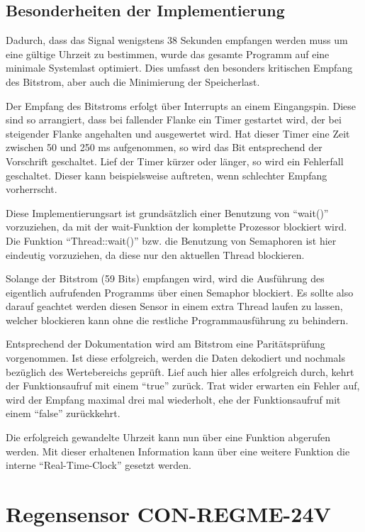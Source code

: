 			\cite{DCF77Wiki}
		\subsection{Besonderheiten der Implementierung}
			Dadurch, dass das Signal wenigstens 38 Sekunden empfangen werden muss um eine gültige Uhrzeit zu bestimmen, wurde das gesamte Programm auf eine minimale Systemlast optimiert. Dies umfasst den besonders kritischen Empfang des Bitstrom, aber auch die Minimierung der Speicherlast.
			
			Der Empfang des Bitstroms erfolgt über Interrupts an einem Eingangspin. Diese sind so arrangiert, dass bei fallender Flanke ein Timer gestartet wird, der bei steigender Flanke angehalten und ausgewertet wird. Hat dieser Timer eine Zeit zwischen 50 und 250 ms aufgenommen, so wird das Bit entsprechend der Vorschrift geschaltet. Lief der Timer kürzer oder länger, so wird ein Fehlerfall geschaltet. Dieser kann beispielsweise auftreten, wenn schlechter Empfang vorherrscht.
			
			Diese Implementierungsart ist grundsätzlich einer Benutzung von \enquote{wait()} vorzuziehen, da mit der wait-Funktion der komplette Prozessor blockiert wird. Die Funktion \enquote{Thread::wait()} bzw. die Benutzung von Semaphoren ist hier eindeutig vorzuziehen, da diese nur den aktuellen Thread blockieren.
			
			Solange der Bitstrom (59 Bits) empfangen wird, wird die Ausführung des eigentlich aufrufenden Programms über einen Semaphor blockiert. Es sollte also darauf geachtet werden diesen Sensor in einem extra Thread laufen zu lassen, welcher blockieren kann ohne die restliche Programmausführung zu behindern.
			
			Entsprechend der Dokumentation wird am Bitstrom eine Paritätsprüfung vorgenommen. Ist diese erfolgreich, werden die Daten dekodiert und nochmals bezüglich des Wertebereichs geprüft. Lief auch hier alles erfolgreich durch, kehrt der Funktionsaufruf mit einem \enquote{true} zurück. Trat wider erwarten ein Fehler auf, wird der Empfang maximal drei mal wiederholt, ehe der Funktionsaufruf mit einem \enquote{false} zurückkehrt.
			
			Die erfolgreich gewandelte Uhrzeit kann nun über eine Funktion abgerufen werden. Mit dieser erhaltenen Information kann über eine weitere Funktion die interne \enquote{Real-Time-Clock} gesetzt werden.
	\section{Regensensor CON-REGME-24V}
